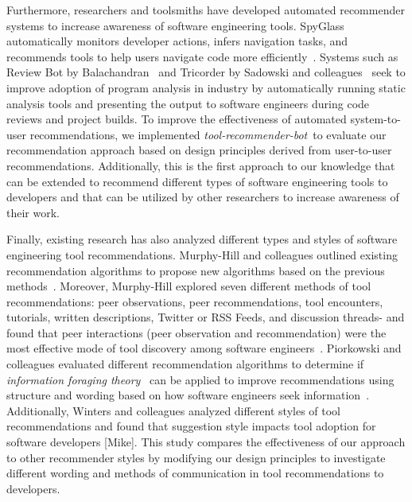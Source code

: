 \documentclass[sigconf,review,anonymous]{acmart}
\newcommand{\tool}{\textsl{tool-recommender-bot}}
\begin{document}
Furthermore, researchers and toolsmiths have developed automated recommender systems to increase awareness of software engineering tools. SpyGlass automatically monitors developer actions, infers navigation tasks, and recommends tools to help users navigate code more efficiently~\cite{Viriyakattiyaporn2010Spyglass}. Systems such as Review Bot by Balachandran~\cite{BalachandranReviewBot} and Tricorder by Sadowski and colleagues~\cite{SadowskiTricorder} seek to improve adoption of program analysis in industry by automatically running static analysis tools and presenting the output to software engineers during code reviews and project builds. To improve the effectiveness of automated system-to-user recommendations, we implemented \tool~to evaluate our recommendation approach based on design principles derived from user-to-user recommendations. Additionally, this is the first approach to our knowledge that can be extended to recommend different types of software engineering tools to developers and that can be utilized by other researchers to increase awareness of their work.

Finally, existing research has also analyzed different types and styles of software engineering tool recommendations. Murphy-Hill and colleagues outlined existing recommendation algorithms to propose new algorithms based on the previous methods~\cite{Murphy-Hill2011Fluency}. Moreover, Murphy-Hill explored seven different methods of tool recommendations: peer observations, peer recommendations, tool encounters, tutorials, written descriptions, Twitter or RSS Feeds, and discussion threads- and found that peer interactions (peer observation and recommendation) were the most effective mode of tool discovery among software engineers~\cite{Murphy-Hill2011PeerInteraction, Murphy-Hill2015HowDoUsers}. Piorkowski and colleagues evaluated different recommendation algorithms to determine if \textit{information foraging theory}~\cite{Pirolli1999IFT} can be applied to improve recommendations using structure and wording based on how software engineers seek information~\cite{Piorkowski2012ReactiveIFT}. Additionally, Winters and colleagues analyzed different styles of tool recommendations and found that suggestion style impacts tool adoption for software developers [Mike]. This study compares the effectiveness of our approach to other recommender styles by modifying our design principles to investigate different wording and methods of communication in tool recommendations to developers.
\end{document}
